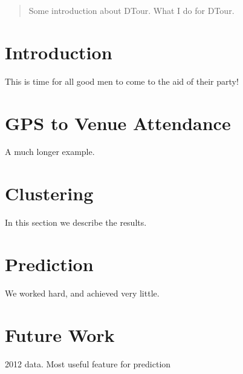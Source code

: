\documentclass[12pt]{article}
\begin{document}
\maketitle

\begin{abstract}
Some introduction about DTour. What I do for DTour.
\end{abstract}

\section{Introduction}
This is time for all good men to come to the aid of their party!

\section{GPS to Venue Attendance}\label{gps_venue}
A much longer \LaTeXe{} example. 

\section{Clustering}\label{clustering}
In this section we describe the results.

\section{Prediction}\label{prediction}
We worked hard, and achieved very little.

\section{Future Work}\label{future_work}
2012 data. Most useful feature for prediction
\end{document}
